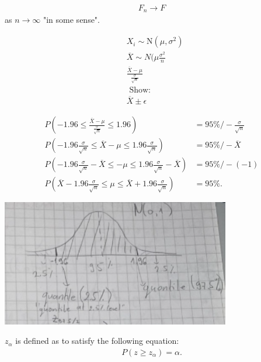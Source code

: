 \documentclass[10pt]{article}
\begin{document}
\begin{theorem} \label{thm:Glivenko-Conteli}
\begin{align*}
F_n \rightarrow F
\end{align*}
as \(n \rightarrow \infty\) "in some sense".
\end{theorem}



\begin{align*}
 &  X_i \sim \text{N}(\mu , \sigma^2) \\
 &  \overline{X} \sim N(\mu  \frac{\sigma ^2 }{n} \\
 &  \frac{\overline{X} -  \mu }{\frac{\sigma}{\sqrt{n}}} \\
 &  \text{ Show: } \\
 &  \overline{X} \pm \epsilon 
\end{align*}

\begin{align*}
P( - 1.96 \leq \frac{\overline{X} - \mu }{\frac{\sigma }{\sqrt{n}}} \leq 1.96)  &  =  95 \%  / -  \frac{\sigma}{\sqrt{n}} \\
P( - 1.96  \frac{\sigma }{\sqrt{n}}\leq \overline{X} - \mu \leq 1.96 \frac{\sigma }{\sqrt{n}})  &  =  95 \%  / -  \overline{X} \\
P( - 1.96  \frac{\sigma }{\sqrt{n}} - \overline{X} \leq - \mu \leq 1.96 \frac{\sigma }{\sqrt{n}} - \overline{X})  &  =  95 \%  / -  ( - 1) \\
P( \overline{X} - 1.96  \frac{\sigma }{\sqrt{n}}  \leq  \mu \leq \overline{X} + 1.96 \frac{\sigma }{\sqrt{n}})  &  =  95 \%.
\end{align*}
\begin{center}
\includegraphics[angle=0,width=10cm]{./img/bell.png}
\end{center}

\begin{definition}[Quantile]  \label{def:Quantile}
\(z _{\alpha }\) is defined as to satisfy the following equation:
\begin{align*}
P(z \geq z _{\alpha } ) = \alpha .
\end{align*}
\end{definition}
\end{document}
